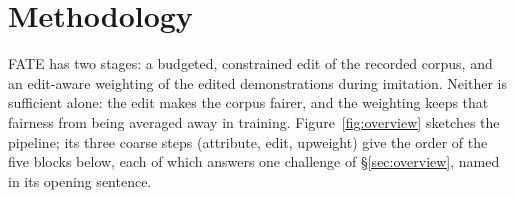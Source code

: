 \section{Methodology}\label{sec:method}

FATE has two stages: a budgeted, constrained edit of the recorded corpus, and
an edit-aware weighting of the edited demonstrations during imitation. Neither
is sufficient alone: the edit makes the corpus fairer, and the weighting keeps
that fairness from being averaged away in training. Figure~\ref{fig:overview}
sketches the pipeline; its three coarse steps (attribute, edit, upweight)
give the order of the five blocks below, each of which answers one
challenge of \S\ref{sec:overview}, named in its opening sentence.

